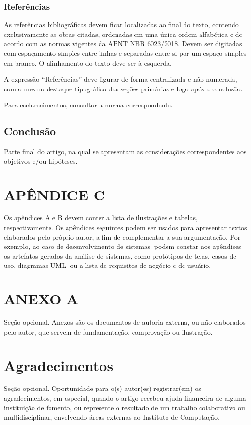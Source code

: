 \documentclass[article,a4paper,12pt,brazil,sumario=tradicional]{abntex2}
\begin{document}
\subsection{Referências}

As referências bibliográficas devem ficar localizadas ao final do texto, contendo exclusivamente as obras citadas, ordenadas em uma única ordem alfabética e de acordo com as normas vigentes da ABNT NBR 6023/2018. Devem ser digitadas com espaçamento simples entre linhas e separadas entre si por um espaço simples em branco. O alinhamento do texto deve ser à esquerda.

A expressão ``Referências'' deve figurar de forma centralizada e não numerada, com o mesmo destaque tipográfico das seções primárias e logo após a conclusão.

Para esclarecimentos, consultar a norma correspondente.

\section{Conclusão}

Parte final do artigo, na qual se apresentam as considerações correspondentes aos objetivos e/ou hipóteses.

\newpage


\newpage
\renewcommand{\listfigurename}{APÊNDICE A - Lista de ilustrações}
\listoffigures

\newpage
\renewcommand{\listtablename}{APÊNDICE B - Lista de tabelas}
\listoftables

\begin{appendices}
\newpage
\chapter* {APÊNDICE C}
\noindent
Os apêndices A e B devem conter a lista de ilustrações e tabelas, respectivamente. Os apêndices seguintes podem ser usados para apresentar textos elaborados pelo próprio autor, a fim de complementar a sua argumentação. Por exemplo, no caso de desenvolvimento de sistemas, podem constar nos apêndices os artefatos gerados da análise de sistemas, como protótipos de telas, casos de uso, diagramas UML, ou a lista de requisitos de negócio e de usuário.

\newpage
\chapter*{ANEXO A}
\noindent
Seção opcional. Anexos são os documentos de autoria externa, ou não elaborados pelo autor, que servem de fundamentação, comprovação ou ilustração.
\end{appendices}

\newpage
\chapter*{Agradecimentos}
\noindent
Seção opcional. Oportunidade para o(s) autor(es) registrar(em) os agradecimentos, em especial, quando o artigo recebeu ajuda financeira de alguma instituição de fomento, ou represente o resultado de um trabalho colaborativo ou multidisciplinar, envolvendo áreas externas ao Instituto de Computação.
\end{document}

